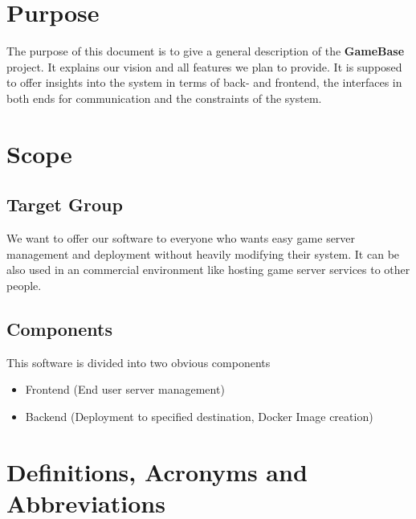 \documentclass[a4paper,12pt,chapterprefix=false,bibliography=totoc,listof=totoc,]{scrreprt}
\begin{document}

\section{Purpose}
The purpose of this document is to give a general description of the \textbf{GameBase} project. It explains our vision and all features we plan to provide. It is supposed to offer insights into the system in terms of back- and frontend, the interfaces in both ends for communication and the constraints of the system.

\section{Scope}
\subsection*{Target Group}
We want to offer our software to everyone who wants easy game server management and deployment without heavily modifying their system. It can be also used in an commercial environment like hosting game server services to other people.

\subsection*{Components}
This software is divided into two obvious components
\begin{itemize}
	\item Frontend (End user server management)
	\item Backend (Deployment to specified destination, Docker Image creation)
\end{itemize}

\section{Definitions, Acronyms and Abbreviations}
\printabbreviations[title={}]
\end{document}
